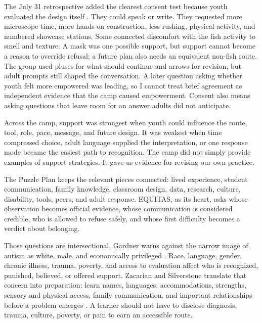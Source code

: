 The July 31 retrospective added the clearest consent test because youth evaluated the design itself \citep{campteam2026day6}. They could speak or write. They requested more microscope time, more hands-on construction, less rushing, physical activity, and numbered showcase stations. Some connected discomfort with the fish activity to smell and texture. A mask was one possible support, but support cannot become a reason to override refusal; a future plan also needs an equivalent non-fish route. The group used pluses for what should continue and arrows for revision, but adult prompts still shaped the conversation. A later question asking whether youth felt more empowered was leading, so I cannot treat brief agreement as independent evidence that the camp caused empowerment. Consent also means asking questions that leave room for an answer adults did not anticipate.

Across the camp, support was strongest when youth could influence the route, tool, role, pace, message, and future design. It was weakest when time compressed choice, adult language supplied the interpretation, or one response mode became the easiest path to recognition. The camp did not simply provide examples of support strategies. It gave us evidence for revising our own practice.


The Puzzle Plan keeps the relevant pieces connected: lived experience, student communication, family knowledge, classroom design, data, research, culture, disability, tools, peers, and adult response. EQUITAS, as its heart, asks whose observation becomes official evidence, whose communication is considered credible, who is allowed to refuse safely, and whose first difficulty becomes a verdict about belonging.

Those questions are intersectional. Gardner warns against the narrow image of autism as white, male, and economically privileged \citep{gardner2017firsthand}. Race, language, gender, chronic illness, trauma, poverty, and access to evaluation affect who is recognized, punished, believed, or offered support. Zacarian and Silverstone translate that concern into preparation: learn names, languages, accommodations, strengths, sensory and physical access, family communication, and important relationships before a problem emerges \citep{zacarian2015community}. A learner should not have to disclose diagnosis, trauma, culture, poverty, or pain to earn an accessible route.

